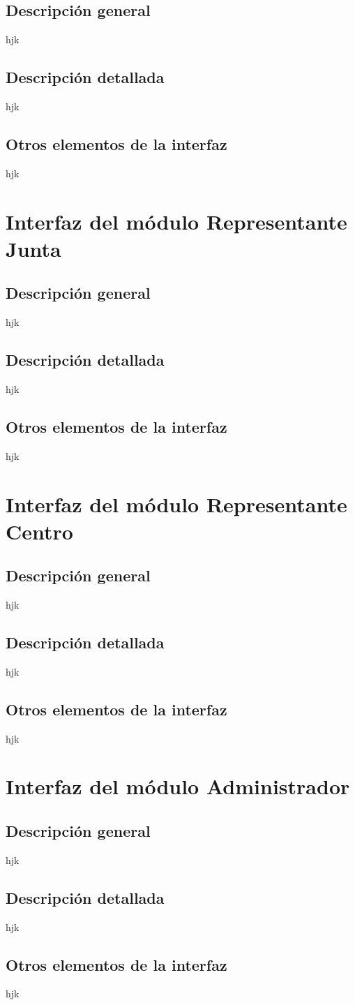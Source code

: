 \subsection{Descripción general}
hjk
\subsection{Descripción detallada}
hjk
\subsection{Otros elementos de la interfaz}
hjk

\section{Interfaz del módulo Representante Junta}
\subsection{Descripción general}
hjk
\subsection{Descripción detallada}
hjk
\subsection{Otros elementos de la interfaz}
hjk

\section{Interfaz del módulo Representante Centro}
\subsection{Descripción general}
hjk
\subsection{Descripción detallada}
hjk
\subsection{Otros elementos de la interfaz}
hjk

\section{Interfaz del módulo Administrador}
\subsection{Descripción general}
hjk
\subsection{Descripción detallada}
hjk
\subsection{Otros elementos de la interfaz}
hjk






